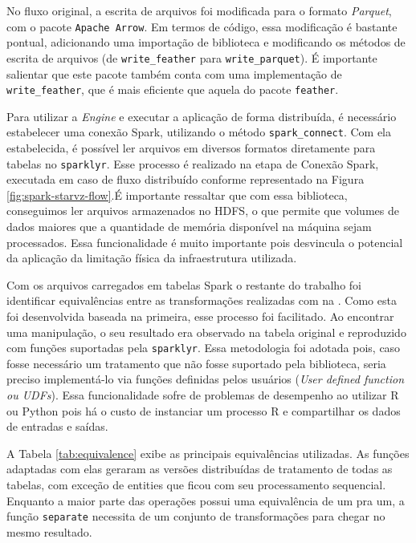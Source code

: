No fluxo original, a escrita de arquivos foi modificada para o formato 
\textit{Parquet}, com o pacote \texttt{Apache Arrow}. Em termos de código, essa 
modificação é bastante pontual, adicionando uma importação de biblioteca e 
modificando os métodos de escrita de arquivos (de \texttt{write\_feather} 
para \texttt{write\_parquet}). É importante salientar que este pacote também 
conta com uma implementação de \texttt{write\_feather}, que é mais eficiente 
que aquela do pacote \texttt{feather}.

Para utilizar a \textit{Engine} e executar a aplicação de forma distribuída, é 
necessário estabelecer uma conexão Spark, utilizando o método 
\texttt{spark\_connect}. Com ela estabelecida, é possível ler arquivos em 
diversos formatos diretamente para tabelas no \texttt{sparklyr}. Esse processo 
é realizado na etapa de Conexão Spark, executada em caso de fluxo distribuído 
conforme representado na Figura \ref{fig:spark-starvz-flow}.É importante 
ressaltar que com essa biblioteca, conseguimos ler arquivos armazenados no HDFS, 
o que permite que volumes de dados maiores que a quantidade de memória 
disponível na máquina sejam processados. Essa funcionalidade é muito importante 
pois desvincula o potencial da aplicação da limitação física da infraestrutura 
utilizada.

Com os arquivos carregados em tabelas Spark o restante do trabalho 
foi identificar equivalências entre as transformações realizadas com 
 na . Como esta foi desenvolvida baseada na 
primeira, esse processo foi facilitado. Ao encontrar uma manipulação, o seu 
resultado era observado na tabela original e reproduzido com funções suportadas 
pela \texttt{sparklyr}. Essa metodologia foi adotada pois, caso fosse necessário 
um tratamento que não fosse suportado pela biblioteca, seria preciso 
implementá-lo via funções definidas pelos usuários (\emph{User defined function 
ou UDFs}). Essa funcionalidade sofre de problemas de desempenho ao utilizar R ou 
Python pois há o custo de instanciar um processo R e compartilhar os dados de 
entradas e saídas. 

A Tabela \ref{tab:equivalence} exibe as principais equivalências utilizadas. 
As funções adaptadas com elas geraram as versões distribuídas de tratamento de 
todas as tabelas, com exceção de entities que ficou com seu processamento 
sequencial. Enquanto a maior parte das operações possui uma equivalência de um 
pra um, a função \texttt{separate} necessita de um conjunto de transformações 
para chegar no mesmo resultado. 

